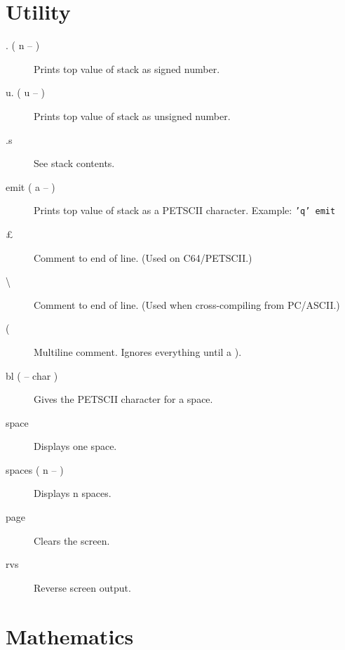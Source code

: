 \section{Utility}

\begin{description}
\item[. ( n -- )] Prints top value of stack as signed number.
\item[u. ( u -- )] Prints top value of stack as unsigned number.
\item[.s] See stack contents.
\item[emit ( a -- )] Prints top value of stack as a PETSCII character. Example: \texttt{'q' emit}
\item[\pounds] Comment to end of line. (Used on C64/PETSCII.)
\item[\textbackslash] Comment to end of line. (Used when cross-compiling from PC/ASCII.)
\item[(] Multiline comment. Ignores everything until a ).
\item[bl ( -- char )] Gives the PETSCII character for a space.
\item[space] Displays one space.
\item[spaces ( n -- )] Displays n spaces.
\item[page] Clears the screen.
\item[rvs] Reverse screen output.
\end{description}

\section{Mathematics}

